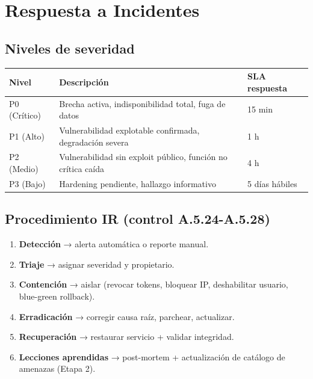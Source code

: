 \documentclass[12pt,a4paper,oneside]{article}
\begin{document}
\section{Respuesta a Incidentes}

\subsection{Niveles de severidad}

\begin{table}[h]
\centering
\small
\begin{tabularx}{\textwidth}{lXl}
\toprule
\textbf{Nivel} & \textbf{Descripción} & \textbf{SLA respuesta} \\
\midrule
P0 (Crítico) & Brecha activa, indisponibilidad total, fuga de datos & 15 min \\
P1 (Alto) & Vulnerabilidad explotable confirmada, degradación severa & 1 h \\
P2 (Medio) & Vulnerabilidad sin exploit público, función no crítica caída & 4 h \\
P3 (Bajo) & Hardening pendiente, hallazgo informativo & 5 días hábiles \\
\bottomrule
\end{tabularx}
\end{table}

\subsection{Procedimiento IR (control A.5.24-A.5.28)}

\begin{enumerate}[leftmargin=*]
  \item \textbf{Detección} → alerta automática o reporte manual.
  \item \textbf{Triaje} → asignar severidad y propietario.
  \item \textbf{Contención} → aislar (revocar tokens, bloquear IP, deshabilitar usuario, blue-green rollback).
  \item \textbf{Erradicación} → corregir causa raíz, parchear, actualizar.
  \item \textbf{Recuperación} → restaurar servicio + validar integridad.
  \item \textbf{Lecciones aprendidas} → post-mortem + actualización de catálogo de amenazas (Etapa 2).
\end{enumerate}
\end{document}
